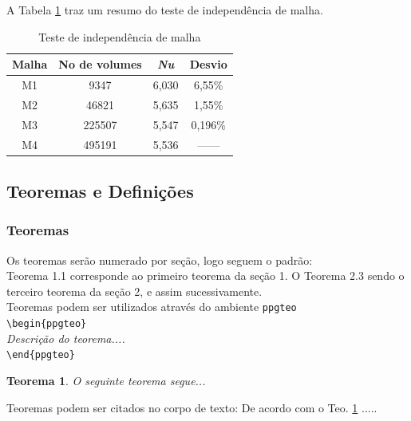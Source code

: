 \documentclass[a4paper,12pt,oneside]{article}
\numberwithin{equation}{section}
\newtheorem{ppgteo}{Teorema}[section]
\begin{document}
A Tabela \ref{tabExemplo} traz um resumo do teste de independência de malha.

\begin{table}[h!]
\begin{center}
	\caption{Teste de independência de malha}
	\begin{tabular}{c|c|c|c} \hline
		\textbf{Malha} & \textbf{No de volumes} & \textbf{\textit{Nu}} & \textbf{Desvio} \\ \hline
		M1 & 9347 		& 6,030	 & 6,55\% \\ 
		M2 & 46821 		& 5,635	 & 1,55\% \\
		M3 & 225507		& 5,547	 & 0,196\% \\
		M4 & 495191		& 5,536	 & ------ \\ \hline
	\end{tabular}
	\label{tabExemplo}
\end{center}
\end{table}

\subsection{Teoremas e Definições}

\subsubsection{Teoremas}
Os teoremas serão numerado por seção, logo seguem o padrão:\\


Teorema 1.1 corresponde ao primeiro teorema da seção 1. O Teorema 2.3 sendo o terceiro teorema da seção 2, e assim sucessivamente.\\


Teoremas podem ser utilizados através do ambiente \texttt{ppgteo}\\

\noindent \texttt{\textbackslash begin\{ppgteo\}}\\
\textit{Descrição do teorema....}\\
\texttt{\textbackslash end\{ppgteo\}}\\

\begin{ppgteo}
O seguinte teorema segue...
\label{teo1}
\end{ppgteo}

Teoremas podem ser citados no corpo de texto: De acordo com o Teo. \ref{teo1} .....\\
\end{document}
